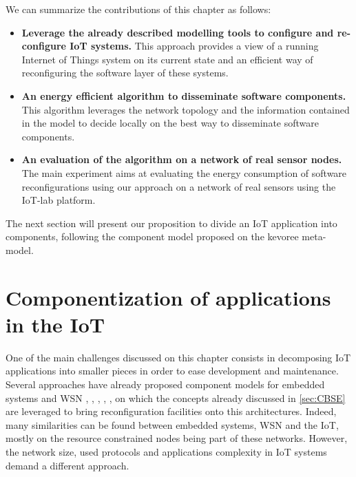 We can summarize the contributions of this chapter as follows:
\begin{itemize}
	\item \textbf{Leverage the already described modelling tools to configure and re-configure IoT systems.} This approach provides a view of a running Internet of Things system on its current state and an efficient way of reconfiguring the software layer of these systems.
	\item \textbf{An energy efficient algorithm to disseminate software components.} This algorithm leverages the network topology and the information contained in the model to decide locally on the best way to disseminate software components.
	\item \textbf{An evaluation of the algorithm on a network of real sensor nodes.} The main experiment aims at evaluating the energy consumption of software reconfigurations using our approach on a network of real sensors using the IoT-lab platform.
\end{itemize}


The next section will present our proposition to divide an IoT application into components, following the component model proposed on the kevoree meta-model.


\section{Componentization of applications in the IoT}
One of the main challenges discussed on this chapter consists in decomposing IoT applications into smaller pieces in order to ease development and maintenance.
Several approaches have already proposed component models for embedded systems \cite{friedrich2001survey} and WSN  \cite{marron2006flexcup},  \cite{grace2004gridkit},  \cite{mottola2008figaro},  \cite{cid2012looci},  \cite{taherkordi2013optimizing}, on which the concepts already discussed in \ref{sec:CBSE} are leveraged to bring reconfiguration facilities onto this architectures.
Indeed, many similarities can be found between embedded systems, WSN and the IoT, mostly on the resource constrained nodes being part of these networks.
However, the network size, used protocols and applications complexity in IoT systems demand a different approach.

